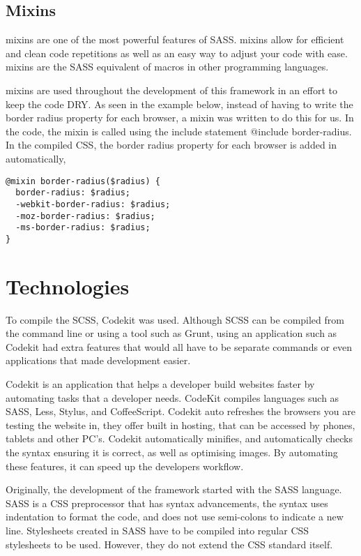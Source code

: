 \subsection*{Mixins}
\gls{mixins} are one of the most powerful features of \gls{SASS}. \gls{mixins} allow for efficient and clean code repetitions as well as an easy way to adjust your code with ease. \gls{mixins} are the \gls{SASS} equivalent of macros in other programming languages.

\gls{mixins} are used throughout the development of this framework in an effort to keep the code DRY. As seen in the example below, instead of having to write the border radius property for each browser, a mixin was written to do this for us. In the code, the mixin is called using the include statement @include border-radius. In the compiled CSS, the border radius property for each browser is added in automatically, 

\begin{lstlisting}[language=CSS3]
@mixin border-radius($radius) {
  border-radius: $radius;
  -webkit-border-radius: $radius;
  -moz-border-radius: $radius;
  -ms-border-radius: $radius;
}
\end{lstlisting}


\newpage
\section*{Technologies}

To compile the \gls{SCSS}, Codekit \citep{CODEKIT17} was used. Although \gls{SCSS} can be compiled from the command line or using a tool such as Grunt, using an application such as Codekit had extra features that would all have to be separate commands or even applications that made development easier. 

Codekit is an application that helps a developer build websites faster by automating tasks that a developer needs. CodeKit compiles languages such as SASS, Less, Stylus, and CoffeeScript. Codekit auto refreshes the browsers you are testing the website in, they offer built in hosting, that can be accessed by phones, tablets and other PC's. Codekit automatically minifies, and automatically checks the syntax ensuring it is correct, as well as optimising images. By automating these features, it can speed up the developers workflow. 

Originally, the development of the framework started with the \gls{SASS} language. \gls{SASS} is a \gls{CSS} preprocessor that has syntax advancements, the syntax uses indentation to format the code, and does not use semi-colons to indicate a new line. Stylesheets created in \gls{SASS} have to be compiled into regular \gls{CSS} stylesheets to be used. However, they do not extend the \gls{CSS} standard itself. 

